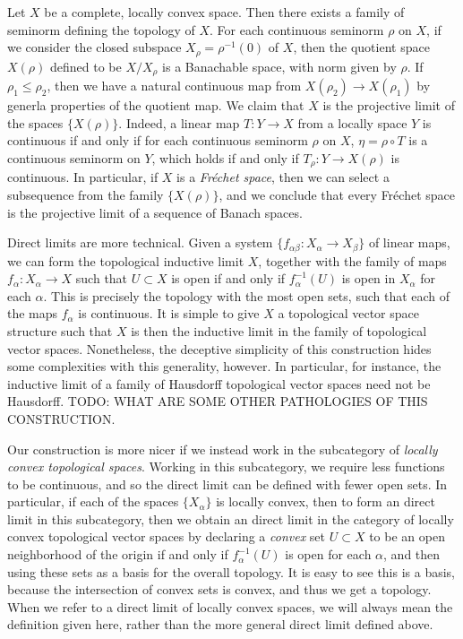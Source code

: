 \begin{example}
    Let $X$ be a complete, locally convex space. Then there exists a family of seminorm defining the topology of $X$. For each continuous seminorm $\rho$ on $X$, if we consider the closed subspace $X_\rho = \rho^{-1}(0)$ of $X$, then the quotient space $X(\rho)$ defined to be $X / X_\rho$ is a Banachable space, with norm given by $\rho$. If $\rho_1 \leq \rho_2$, then we have a natural continuous map from $X(\rho_2) \to X(\rho_1)$ by generla properties of the quotient map. We claim that $X$ is the projective limit of the spaces $\{ X(\rho) \}$. Indeed, a linear map $T: Y \to X$ from a locally space $Y$ is continuous if and only if for each continuous seminorm $\rho$ on $X$, $\eta = \rho \circ T$ is a continuous seminorm on $Y$, which holds if and only if $T_\rho: Y \to X(\rho)$ is continuous. In particular, if $X$ is a \emph{Fr\'{e}chet space}, then we can select a subsequence from the family $\{ X(\rho) \}$, and we conclude that every Fr\'{e}chet space is the projective limit of a sequence of Banach spaces.
\end{example}

Direct limits are more technical. Given a system $\{ f_{\alpha \beta}: X_\alpha \to X_\beta \}$ of linear maps, we can form the topological inductive limit $X$, together with the family of maps $f_\alpha: X_\alpha \to X$ such that $U \subset X$ is open if and only if $f_\alpha^{-1}(U)$ is open in $X_\alpha$ for each $\alpha$. This is precisely the topology with the most open sets, such that each of the maps $f_\alpha$ is continuous. It is simple to give $X$ a topological vector space structure such that $X$ is then the inductive limit in the family of topological vector spaces. Nonetheless, the deceptive simplicity of this construction hides some complexities with this generality, however. In particular, for instance, the inductive limit of a family of Hausdorff topological vector spaces need not be Hausdorff. TODO: WHAT ARE SOME OTHER PATHOLOGIES OF THIS CONSTRUCTION.

Our construction is more nicer if we instead work in the subcategory of \emph{locally convex topological spaces}. Working in this subcategory, we require less functions to be continuous, and so the direct limit can be defined with fewer open sets. In particular, if each of the spaces $\{ X_\alpha \}$ is locally convex, then to form an direct limit in this subcategory, then we obtain an direct limit in the category of locally convex topological vector spaces by declaring a \emph{convex} set $U \subset X$ to be an open neighborhood of the origin if and only if $f_\alpha^{-1}(U)$ is open for each $\alpha$, and then using these sets as a basis for the overall topology. It is easy to see this is a basis, because the intersection of convex sets is convex, and thus we get a topology. When we refer to a direct limit of locally convex spaces, we will always mean the definition given here, rather than the more general direct limit defined above.

